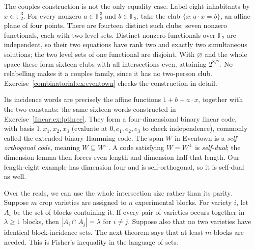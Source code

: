The couples construction is not the only equality case. Label eight inhabitants
by $x\in\mathbb F_2^3$. For every nonzero $a\in\mathbb F_2^3$ and $b\in\mathbb F_2$,
take the club $\{x:a\cdot x=b\}$, an affine plane of four points.
There are fourteen distinct such clubs: seven nonzero functionals, each with
two level sets. Distinct nonzero functionals over $\mathbb F_2$ are independent,
so their two equations have rank two and exactly two simultaneous solutions;
the two level sets of one functional are disjoint. With $\varnothing$ and the
whole space these form sixteen clubs with all intersections even, attaining
$2^{8/2}$. No relabelling makes it a couples family, since it has no two-person
club. Exercise~\ref{combinatorial:ex:eventown} checks the construction in detail.

Its incidence words are precisely the affine functions $1+b+a\cdot x$,
together with the two constants: the same sixteen words constructed in
Exercise~\ref{linear:ex:lpthree}. They form a four-dimensional binary linear
code, with basis $1,x_1,x_2,x_3$ (evaluate at $0,e_1,e_2,e_3$ to check
independence), commonly called the extended binary Hamming code.
The span $W$ in Eventown is a \emph{self-orthogonal code}, meaning
$W\subseteq W^\perp$. A code satisfying $W=W^\perp$ is \emph{self-dual};
the dimension lemma then forces even length and dimension half that length.
Our length-eight example has dimension four and is self-orthogonal, so it
is self-dual as well.

Over the reals, we can use the whole intersection size rather than its
parity. Suppose $m$ crop varieties are assigned to $n$ experimental blocks.
For variety $i$, let $A_i$ be the set of blocks containing it. If every pair
of varieties occurs together in $\lambda\ge1$ blocks, then
$|A_i\cap A_j|=\lambda$ for $i\ne j$. Suppose also that no two varieties
have identical block-incidence sets. The next theorem says that at least
$m$ blocks are needed. This is Fisher's inequality in the language of sets.

